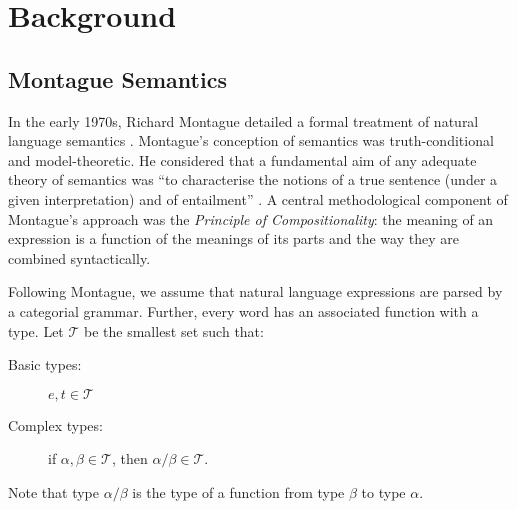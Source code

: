 \documentclass[manuscript]{clv2}
\begin{document}

\section{Background}

\subsection{Montague Semantics}

In the early 1970s, 
Richard Montague detailed a formal treatment of natural language semantics \cite{Montague1970a,Montague1970b,Montague1973}. Montague's conception of semantics was truth-conditional and model-theoretic. He considered that a fundamental aim of any adequate theory of semantics was ``to characterise the notions of a true sentence (under a given interpretation) and of entailment'' \cite{Montague1970b}. A central methodological component of Montague's approach was the {\em Principle of Compositionality\/}: the meaning of an expression is a function of the meanings of its parts and the way they are combined syntactically.

Following Montague, we assume that natural language expressions
are parsed by a categorial grammar. Further,  every word has an
associated function with a type. Let $\mathcal{T}$ be the smallest set such that:
\begin{description}
\item [Basic types:] $e,t\in \mathcal{T}$
\item[Complex types:]  if $\alpha, \beta\in \mathcal{T}$, then $\alpha/\beta\in \mathcal{T}$.
\end{description}
Note that type $\alpha/\beta$ is the type of a function from type   $\beta$
to type $\alpha$.
\end{document}
